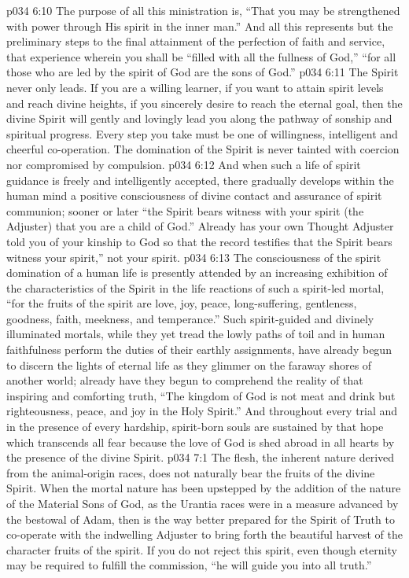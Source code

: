 \vs p034 6:10 The purpose of all this ministration is, “That you may be strengthened with power through His spirit in the inner man.” And all this represents but the preliminary steps to the final attainment of the perfection of faith and service, that experience wherein you shall be “filled with all the fullness of God,” “for all those who are led by the spirit of God are the sons of God.”
\pc \vs p034 6:11 The Spirit never  only leads. If you are a willing learner, if you want to attain spirit levels and reach divine heights, if you sincerely desire to reach the eternal goal, then the divine Spirit will gently and lovingly lead you along the pathway of sonship and spiritual progress. Every step you take must be one of willingness, intelligent and cheerful co\hyp{}operation. The domination of the Spirit is never tainted with coercion nor compromised by compulsion.
\vs p034 6:12 And when such a life of spirit guidance is freely and intelligently accepted, there gradually develops within the human mind a positive consciousness of divine contact and assurance of spirit communion; sooner or later “the Spirit bears witness with your spirit (the Adjuster) that you are a child of God.” Already has your own Thought Adjuster told you of your kinship to God so that the record testifies that the Spirit bears witness  your spirit,” not  your spirit.
\vs p034 6:13 The consciousness of the spirit domination of a human life is presently attended by an increasing exhibition of the characteristics of the Spirit in the life reactions of such a spirit\hyp{}led mortal, “for the fruits of the spirit are love, joy, peace, long\hyp{}suffering, gentleness, goodness, faith, meekness, and temperance.” Such spirit\hyp{}guided and divinely illuminated mortals, while they yet tread the lowly paths of toil and in human faithfulness perform the duties of their earthly assignments, have already begun to discern the lights of eternal life as they glimmer on the faraway shores of another world; already have they begun to comprehend the reality of that inspiring and comforting truth, “The kingdom of God is not meat and drink but righteousness, peace, and joy in the Holy Spirit.” And throughout every trial and in the presence of every hardship, spirit\hyp{}born souls are sustained by that hope which transcends all fear because the love of God is shed abroad in all hearts by the presence of the divine Spirit.
\vs p034 7:1 The flesh, the inherent nature derived from the animal\hyp{}origin races, does not naturally bear the fruits of the divine Spirit. When the mortal nature has been upstepped by the addition of the nature of the Material Sons of God, as the Urantia races were in a measure advanced by the bestowal of Adam, then is the way better prepared for the Spirit of Truth to co\hyp{}operate with the indwelling Adjuster to bring forth the beautiful harvest of the character fruits of the spirit. If you do not reject this spirit, even though eternity may be required to fulfill the commission, “he will guide you into all truth.”
